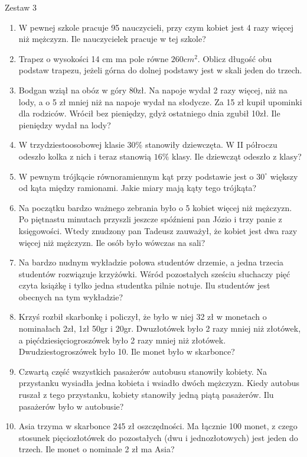 \documentclass[12pt,a4paper]{article}
\begin{document}
\newpage
\LARGE \begin{center}
	Zestaw 3
\end{center}
\normalsize 
\begin{enumerate}[1.]
	\item W pewnej szkole pracuje 95 nauczycieli, przy czym kobiet jest 4 razy więcej niż mężczyzn. Ile nauczycielek pracuje w tej szkole?
	\item Trapez o wysokości 14 cm ma pole równe $260cm^2$. Oblicz długość obu podstaw trapezu, jeżeli górna do dolnej podstawy jest w skali jeden do trzech.
	\item Bodgan wziął na obóz w góry 80zł. Na napoje wydał 2 razy więcej, niż na lody, a o 5 zł mniej niż na napoje wydał na słodycze. Za 15 zł kupił upominki dla rodziców. Wrócił bez pieniędzy, gdyż ostatniego dnia zgubił 10zł. Ile pieniędzy wydał na lody?
	\item W trzydziestoosobowej klasie $30\%$ stanowiły dziewczęta. W II półroczu odeszło kolka z nich i teraz stanowią $16\%$ klasy. Ile dziewcząt odeszło z klasy?
	\item W pewnym trójkącie równoramiennym kąt przy podstawie jest o $30^\circ$ większy od kąta między ramionami. Jakie miary mają kąty tego trójkąta?
	\item Na początku bardzo ważnego zebrania było o 5 kobiet więcej niż mężczyzn. Po piętnastu minutach przyszli jeszcze spóźnieni pan Józio i trzy panie z księgowości. Wtedy znudzony pan Tadeusz zauważył, że kobiet jest dwa razy więcej niż mężczyzn. Ile osób było wówczas na sali?
	\item Na bardzo nudnym wykładzie połowa studentów drzemie, a jedna trzecia studentów rozwiązuje krzyżówki. Wśród pozostałych sześciu słuchaczy pięć czyta książkę i tylko jedna studentka pilnie notuje. Ilu studentów jest obecnych na tym wykładzie?
	\item Krzyś rozbił skarbonkę i policzył, że było w niej 32 zł w monetach o nominałach 2zł, 1zł 50gr i 20gr. Dwuzłotówek było 2 razy mniej niż złotówek, a pięćdziesięciogroszówek było 2 razy mniej niż złotówek. Dwudziestogroszówek było 10. Ile monet było w skarbonce?
	\item Czwartą część wszystkich pasażerów autobusu stanowiły kobiety. Na przystanku wysiadła jedna kobieta i wsiadło dwóch mężczyzn. Kiedy autobus ruszał z tego przystanku, kobiety stanowiły jedną piątą pasażerów. Ilu pasażerów było w autobusie?
	\item Asia trzyma w skarbonce 245 zł oszczędności. Ma łącznie 100 monet, z czego stosunek pięciozłotówek do pozostałych (dwu i jednozłotowych) jest jeden do trzech. Ile monet o nominale 2 zł ma Asia?

\end{enumerate}
\end{document}
